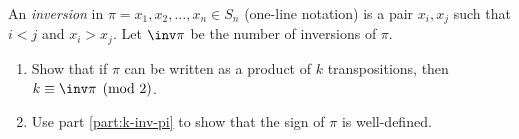 \documentclass{math174}
\date{Wednesday, January 30}
\author{}
\begin{document}
\begin{problem}[1.13.1]
  An \emph{inversion} in \(\pi = x_1, x_2, \dots, x_n \in S_n\)
  (one-line notation) is a pair \(x_i, x_j\) such that \(i<j\) and
  \(x_i>x_j\).  Let \(\inv\pi\) be the number of inversions of
  \(\pi\).
  \begin{enumerate}
  \item \label{part:k-inv-pi} Show that if \(\pi\) can be written
    as a product of \(k\) transpositions, then
    \(k \equiv \inv\pi \pmod 2\).
    \begin{solution}
    \end{solution}
  \item Use part \ref{part:k-inv-pi} to show that the sign of \(\pi\)
    is well-defined.
    \begin{solution}
    \end{solution}
  \end{enumerate}
\end{problem}
\end{document}
